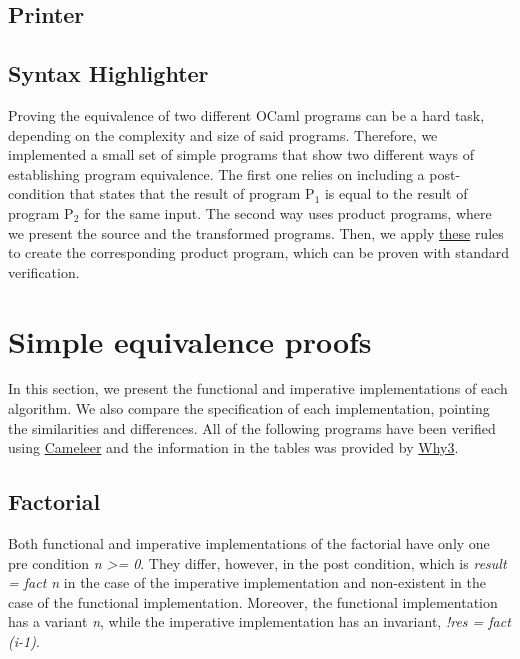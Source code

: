 \subsection{Printer}
\label{subsec:printer}



\subsection{Syntax Highlighter}
\label{subsec:syntax_highlighter}




\iffalse
Proving the equivalence of two different OCaml programs can be a hard task, depending on the complexity and size of said programs.
Therefore, we implemented a small set of simple programs that show two different ways of establishing program equivalence.
The first one relies on including a post-condition that states that the result of program P$_1$ is equal to the result of program P$_2$ for the same input.
The second way uses product programs, where we present the source and the transformed programs.
Then, we apply \hyperref[fig:product_construction_equal_struct]{these} rules to create the corresponding product program, which can be proven with standard verification.


\section{Simple equivalence proofs}
\label{sec:results_eq_proofs}

In this section, we present the functional and imperative implementations of each algorithm.
We also compare the specification of each implementation, pointing the similarities and differences.
All of the following programs have been verified using \hyperref[sec:cameleer]{Cameleer} and the information in the tables was provided by \hyperref[sec:why3]{Why3}.


\subsection{Factorial}
\label{sub:factorial}

Both functional and imperative implementations of the factorial have only one pre condition \emph{n >= 0}.
They differ, however, in the post condition, which is \emph{result = fact n} in the case of the imperative implementation and non-existent in the case of the functional implementation.
Moreover, the functional implementation has a variant \emph{n}, while the imperative implementation has an invariant, \emph{!res = fact (i-1)}. 

